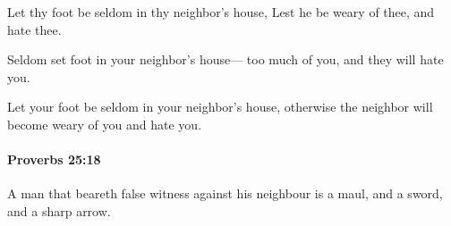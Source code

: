 			\begin{versebox}
					\item[BHS] 
					\item[ASV] Let thy foot be seldom in thy neighbor's house, Lest he be weary of thee, and hate thee.
					\item[NIV] Seldom set foot in your neighbor’s house— too much of you, and they will hate you.
					\item[NRSV] Let your foot be seldom in your neighbor’s house, otherwise the neighbor will become weary of you and hate you.
			\end{versebox}

		\paragraph{Proverbs 25:18} %
			\label{PROVERBS-25-18}

			A man that beareth false witness against his neighbour is a maul, and a sword, and a sharp arrow.

